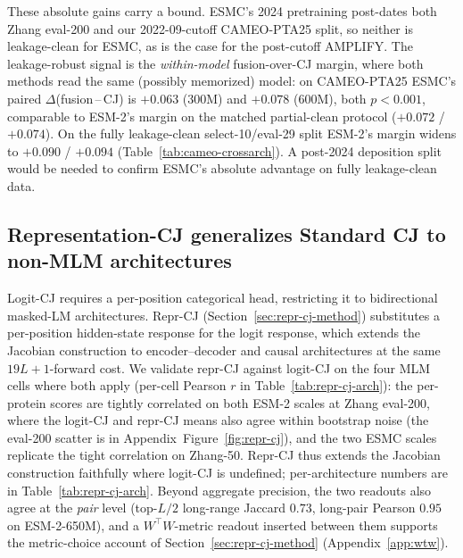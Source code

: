 \documentclass{article}
\begin{document}
These absolute gains carry a bound. ESMC's 2024 pretraining post-dates
both Zhang eval-200 and our 2022-09-cutoff CAMEO-PTA25 split, so neither
is leakage-clean for ESMC, as is the case for the post-cutoff AMPLIFY.
The leakage-robust signal is the \emph{within-model} fusion-over-CJ
margin, where both methods read the same (possibly memorized) model: on
CAMEO-PTA25 ESMC's paired $\Delta$(fusion\,--\,CJ) is $+0.063$ ($300$M)
and $+0.078$ ($600$M), both $p<0.001$, comparable to ESM-2's margin on
the matched partial-clean protocol ($+0.072$ / $+0.074$). On the fully
leakage-clean select-10/eval-29 split ESM-2's margin widens to
$+0.090$ / $+0.094$ (Table~\ref{tab:cameo-crossarch}).
A post-2024 deposition split would be needed to confirm ESMC's
absolute advantage on fully leakage-clean data.

\subsection{Representation-CJ generalizes Standard CJ to non-MLM architectures}
\label{sec:repr-cj}

Logit-CJ requires a per-position categorical head, restricting it to
bidirectional masked-LM architectures. Repr-CJ (Section~\ref{sec:repr-cj-method})
substitutes a per-position hidden-state response for the logit
response, which extends the Jacobian construction to
encoder--decoder and causal architectures at the same
$19L{+}1$-forward cost. We validate repr-CJ against logit-CJ on the
four MLM cells where both apply (per-cell Pearson $r$ in
Table~\ref{tab:repr-cj-arch}): the per-protein scores are tightly
correlated on both ESM-2 scales at Zhang eval-200, where the logit-CJ and
repr-CJ means also agree within bootstrap noise (the eval-200 scatter is
in Appendix~Figure~\ref{fig:repr-cj}), and the two ESMC scales replicate
the tight correlation on Zhang-50. Repr-CJ thus extends the Jacobian
construction faithfully where logit-CJ is undefined; per-architecture
numbers are in
Table~\ref{tab:repr-cj-arch}. Beyond aggregate precision, the two readouts
also agree at the \emph{pair} level (top-$L/2$ long-range Jaccard $0.73$,
long-pair Pearson $0.95$ on ESM-2-650M), and a $W^\top W$-metric readout
inserted between them supports the metric-choice account of
Section~\ref{sec:repr-cj-method} (Appendix~\ref{app:wtw}).
\end{document}
